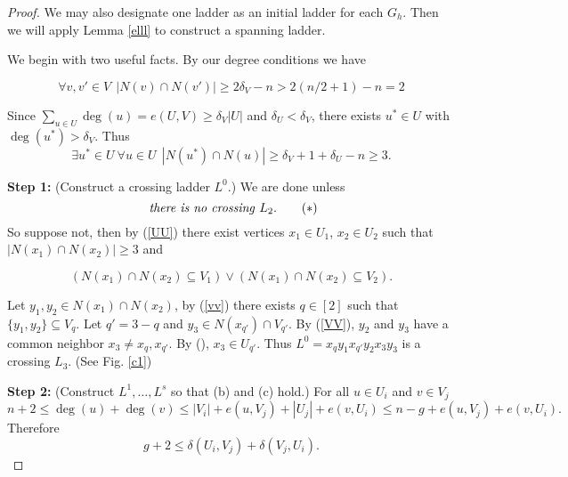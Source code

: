 \documentclass[oneside,12pt]{memoir}
\newcommand{\aster}{\textasteriskcentered}
\begin{document}
\begin{proof}
We may also designate one ladder as an initial ladder for each $G_h$. Then we will apply Lemma \ref{elll} to construct a spanning ladder.

We begin with two useful facts. By our degree conditions we have

\begin{equation}
\forall v,v'\in V~~|N(v)\cap N(v')|\ge 2\delta_V-n>2(n/2+1)-n=2 \label{VV}
\end{equation}

Since $\sum_{u\in U}{\deg(u)}= e(U,V)\ge \delta_V|U|$ and $\delta_U<\delta_V$, there exists $u^*\in U$ with $\deg(u^*)>\delta_V$. Thus 
\begin{equation}
\exists u^*\in U~\forall u\in U~~|N(u^*)\cap N(u)|\ge \delta_V+1+\delta_U-n\ge 3. \label{UU}
\end{equation}

\noindent\textbf{Step 1:} (Construct a crossing ladder $L^0$.) We are done unless 
\begin{equation} \text{ \emph{there is no crossing} } L_2. \tag{\aster}\end{equation}
So suppose not, then by (\ref{UU}) there exist vertices $x_1\in U_1$, $x_2\in U_2$ such that $|N(x_1)\cap N(x_2)|\geq 3$ and

\begin{equation} (N(x_1)\cap N(x_2)\subseteq V_1) \lor (N(x_1)\cap N(x_2)\subseteq V_{2}). \label{vv} \tag{\aster1} %
\end{equation}

Let $y_1,y_2\in N(x_1)\cap N(x_2)$, by (\ref{vv}) there exists $q\in[2]$ such that $\{y_1,y_2\} \subseteq V_q$. Let $q'=3-q$ and $y_3\in N(x_{q'})\cap V_{q'}$. By (\ref{VV}), $y_2$ and $y_3$ have a common neighbor $x_3\ne x_q,x_{q'}$. By (\aster), $x_3\in U_{q'}$. Thus $L^0=x_qy_1x_{q'}y_2x_3y_3$ is a crossing $L_3$. (See Fig. \ref{c1})


\noindent\textbf{Step 2:} (Construct $L^1,\dots,L^s$ so that (b) and (c) hold.)
For all $u \in U_i$ and $v\in V_{j}$
\[
n+2\le \deg(u)+\deg(v)\le |V_i|+e(u, V_{j})+|U_{j}|+e(v,U_i)\le  n-g+e(u,V_{j})+e(v,U_i).
\]
Therefore 
\begin{equation}
g+2\le \delta(U_i,V_j)+\delta(V_j,U_i). \label{WZ}
\end{equation}


\end{proof}
\end{document}
